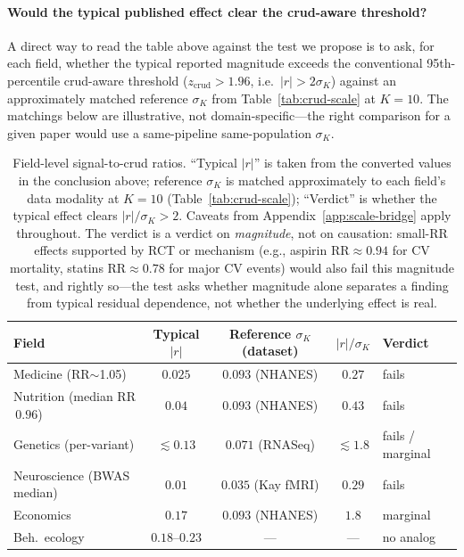 \paragraph{Would the typical published effect clear the crud-aware threshold?} A direct way to read the table above against the test we propose is to ask, for each field, whether the typical reported magnitude exceeds the conventional 95th-percentile crud-aware threshold ($z_{\mathrm{crud}}>1.96$, i.e.\ $|r|>2\sigma_K$) against an approximately matched reference $\sigma_K$ from Table~\ref{tab:crud-scale} at $K=10$. The matchings below are illustrative, not domain-specific---the right comparison for a given paper would use a same-pipeline same-population $\sigma_K$.

\begin{table}[h]
\centering
\caption{Field-level signal-to-crud ratios. ``Typical $|r|$'' is taken from the converted values in the conclusion above; reference $\sigma_K$ is matched approximately to each field's data modality at $K=10$ (Table~\ref{tab:crud-scale}); ``Verdict'' is whether the typical effect clears $|r|/\sigma_K>2$. Caveats from Appendix~\ref{app:scale-bridge} apply throughout. The verdict is a verdict on \emph{magnitude}, not on causation: small-RR effects supported by RCT or mechanism (e.g., aspirin RR$\approx 0.94$ for CV mortality, statins RR$\approx 0.78$ for major CV events) would also fail this magnitude test, and rightly so---the test asks whether magnitude alone separates a finding from typical residual dependence, not whether the underlying effect is real.}
\label{tab:field-ratios}
\begin{tabular}{lcccl}
\toprule
Field & Typical $|r|$ & Reference $\sigma_K$ (dataset) & $|r|/\sigma_K$ & Verdict \\
\midrule
Medicine (RR$\sim$1.05) & $0.025$ & $0.093$ (NHANES) & $0.27$ & fails \\
Nutrition (median RR$\,0.96$) & $0.04$ & $0.093$ (NHANES) & $0.43$ & fails \\
Genetics (per-variant) & $\lesssim 0.13$ & $0.071$ (RNASeq) & $\lesssim 1.8$ & fails / marginal \\
Neuroscience (BWAS median) & $0.01$ & $0.035$ (Kay fMRI) & $0.29$ & fails \\
Economics & $0.17$ & $0.093$ (NHANES) & $1.8$ & marginal \\
Beh.\ ecology & $0.18$--$0.23$ & --- & --- & no analog \\
\bottomrule
\end{tabular}
\end{table}

